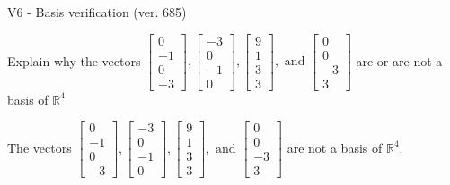 \begin{exercise}
  \begin{exerciseTitle}V6 - Basis verification (ver. 685)\end{exerciseTitle}
  \begin{exerciseStatement}
    Explain why the vectors \(\left[\begin{array}{r}
0 \\
-1 \\
0 \\
-3
\end{array}\right] , \left[\begin{array}{r}
-3 \\
0 \\
-1 \\
0
\end{array}\right] , \left[\begin{array}{r}
9 \\
1 \\
3 \\
3
\end{array}\right] , \text{ and } \left[\begin{array}{r}
0 \\
0 \\
-3 \\
3
\end{array}\right]\) are or are not a basis of \(\mathbb{R}^4\)	


  \end{exerciseStatement}
  \begin{exerciseAnswer}
   The vectors \(\left[\begin{array}{r}
0 \\
-1 \\
0 \\
-3
\end{array}\right] , \left[\begin{array}{r}
-3 \\
0 \\
-1 \\
0
\end{array}\right] , \left[\begin{array}{r}
9 \\
1 \\
3 \\
3
\end{array}\right] , \text{ and } \left[\begin{array}{r}
0 \\
0 \\
-3 \\
3
\end{array}\right]\) 
  	 are not  a basis of \(\mathbb{R}^4\).
  


  \end{exerciseAnswer}
\end{exercise}